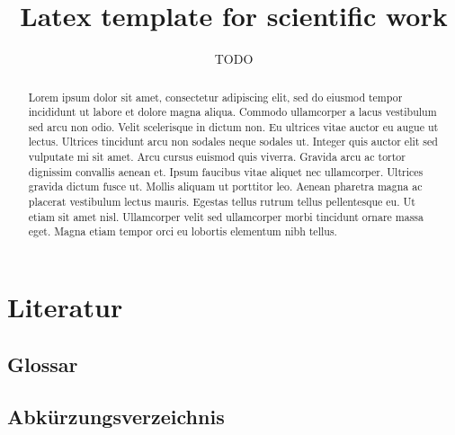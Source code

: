 \documentclass[a4paper, 11pt,abstract=on,usegeometry]{scrreprt}
\title{Latex template for scientific work}
\author{TODO}
\makeatletter
\renewcommand\listoftables{%
\section{\listtablename}%
\@starttoc{lot}%
}
\renewcommand\listoffigures{%
\section{\listfigurename}%
\@starttoc{lof}%
}
\newcommand\blankpage{%
\null
\thispagestyle{empty}%
\newpage}
\makeatother
\begin{document}

    \maketitle

    \begin{abstract}
        Lorem ipsum dolor sit amet, consectetur adipiscing elit, sed do eiusmod tempor incididunt ut labore et dolore magna aliqua. Commodo ullamcorper a lacus vestibulum sed arcu non odio. Velit scelerisque in dictum non. Eu ultrices vitae auctor eu augue ut lectus. Ultrices tincidunt arcu non sodales neque sodales ut. Integer quis auctor elit sed vulputate mi sit amet. Arcu cursus euismod quis viverra. Gravida arcu ac tortor dignissim convallis aenean et. Ipsum faucibus vitae aliquet nec ullamcorper. Ultrices gravida dictum fusce ut. Mollis aliquam ut porttitor leo. Aenean pharetra magna ac placerat vestibulum lectus mauris. Egestas tellus rutrum tellus pellentesque eu. Ut etiam sit amet nisl. Ullamcorper velit sed ullamcorper morbi tincidunt ornare massa eget. Magna etiam tempor orci eu lobortis elementum nibh tellus.

    \end{abstract}
    \glsresetall
    \clearpage
    
    \tableofcontents
    
    \glsresetall


    

    \renewcommand{\thechapter}{A}
    \chapter{Literatur}
    \begin{flushleft}
        
        
    \end{flushleft}
    \clearpage
    \section{Glossar} %
    \printglossary %
    \clearpage
    \listoffigures
    \clearpage
    \listoftables
    \clearpage
    \section{Abkürzungsverzeichnis} %
    \printglossary[type=\acronymtype,title={Abkürzungsverzeichnis}]

    \renewcommand{\thechapter}{B}
\end{document}
